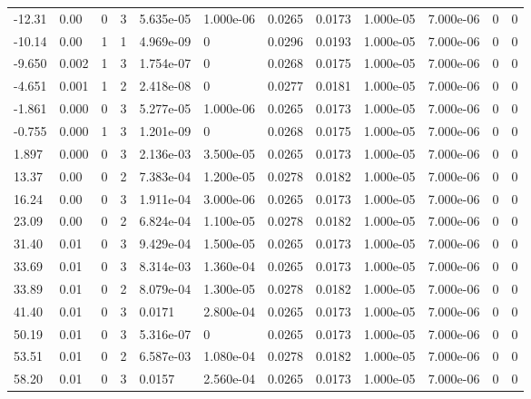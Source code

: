\documentclass[preview]{standalone}
\begin{document}
{{\begin{tabular}{L{1.2cm}C{1.2cm} C{0.3cm}C{0.5cm} C{1.4cm}C{1.4cm} C{1.4cm}C{1.4cm} C{1.6cm}C{1.6cm} C{1.6cm}C{1.6cm}}
  -12.31  &  0.00  & 0     &  3 &  5.635e-05  & 1.000e-06  &  0.0265&   0.0173& 1.000e-05 & 7.000e-06   &  0 & 0  \\ 
  -10.14  &  0.00  & 1     &  1 &  4.969e-09  & 0  &  0.0296&   0.0193& 1.000e-05 & 7.000e-06   &  0 & 0  \\ 
  -9.650  &  0.002  & 1     &  3 &  1.754e-07  & 0  &  0.0268&   0.0175& 1.000e-05 & 7.000e-06   &  0 & 0  \\ 
  -4.651  &  0.001  & 1     &  2 &  2.418e-08  & 0  &  0.0277&   0.0181& 1.000e-05 & 7.000e-06   &  0 & 0  \\ 
  -1.861  &  0.000  & 0     &  3 &  5.277e-05  & 1.000e-06  &  0.0265&   0.0173& 1.000e-05 & 7.000e-06   &  0 & 0  \\ 
  -0.755  &  0.000  & 1     &  3 &  1.201e-09  & 0  &  0.0268&   0.0175& 1.000e-05 & 7.000e-06   &  0 & 0  \\ 
  1.897  &  0.000  & 0     &  3 &  2.136e-03  & 3.500e-05  &  0.0265&   0.0173& 1.000e-05 & 7.000e-06   &  0 & 0  \\ 
  13.37  &  0.00  & 0     &  2 &  7.383e-04  & 1.200e-05  &  0.0278&   0.0182& 1.000e-05 & 7.000e-06   &  0 & 0  \\ 
  16.24  &  0.00  & 0     &  3 &  1.911e-04  & 3.000e-06  &  0.0265&   0.0173& 1.000e-05 & 7.000e-06   &  0 & 0  \\ 
  23.09  &  0.00  & 0     &  2 &  6.824e-04  & 1.100e-05  &  0.0278&   0.0182& 1.000e-05 & 7.000e-06   &  0 & 0  \\ 
  31.40  &  0.01  & 0     &  3 &  9.429e-04  & 1.500e-05  &  0.0265&   0.0173& 1.000e-05 & 7.000e-06   &  0 & 0  \\ 
  33.69  &  0.01  & 0     &  3 &  8.314e-03  & 1.360e-04  &  0.0265&   0.0173& 1.000e-05 & 7.000e-06   &  0 & 0  \\ 
  33.89  &  0.01  & 0     &  2 &  8.079e-04  & 1.300e-05  &  0.0278&   0.0182& 1.000e-05 & 7.000e-06   &  0 & 0  \\ 
  41.40  &  0.01  & 0     &  3 &  0.0171  & 2.800e-04  &  0.0265&   0.0173& 1.000e-05 & 7.000e-06   &  0 & 0  \\ 
  50.19  &  0.01  & 0     &  3 &  5.316e-07  & 0  &  0.0265&   0.0173& 1.000e-05 & 7.000e-06   &  0 & 0  \\ 
  53.51  &  0.01  & 0     &  2 &  6.587e-03  & 1.080e-04  &  0.0278&   0.0182& 1.000e-05 & 7.000e-06   &  0 & 0  \\ 
  58.20  &  0.01  & 0     &  3 &  0.0157  & 2.560e-04  &  0.0265&   0.0173& 1.000e-05 & 7.000e-06   &  0 & 0  \\ 

\end{tabular}}}
\end{document}
